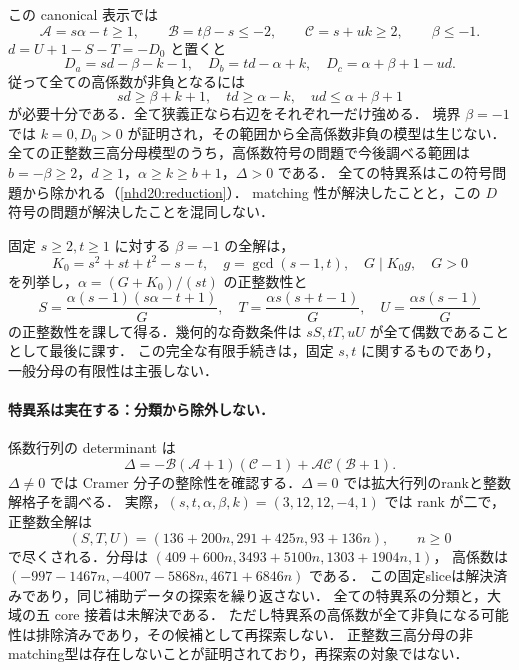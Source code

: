 この canonical 表示では
\[
 \mathcal A=s\alpha-t\geq1,\qquad
 \mathcal B=t\beta-s\leq-2,\qquad
 \mathcal C=s+uk\geq2,\qquad \beta\leq-1.
\]
$d=U+1-S-T=-D_0$ と置くと
\[
 D_a=sd-\beta-k-1,\quad D_b=td-\alpha+k,\quad
 D_c=\alpha+\beta+1-ud.
\]
従って全ての高係数が非負となるには
\[
 sd\geq\beta+k+1,\quad td\geq\alpha-k,\quad
 ud\leq\alpha+\beta+1
\]
が必要十分である．全て狭義正なら右辺をそれぞれ一だけ強める．
境界 $\beta=-1$ では $k=0,D_0>0$ が証明され，その範囲から全高係数非負の模型は生じない．
全ての正整数三高分母模型のうち，高係数符号の問題で今後調べる範囲は
$b=-\beta\ge2$，$d\ge1$，$\alpha\ge k\ge b+1$，$\Delta>0$ である．
全ての特異系はこの符号問題から除かれる（\ref{nhd20:reduction}）．
matching 性が解決したことと，この $D$ 符号の問題が解決したことを混同しない．

固定 $s\geq2,t\geq1$ に対する $\beta=-1$ の全解は，
\[
 K_0=s^2+st+t^2-s-t,\quad g=\gcd(s-1,t),\quad G\mid K_0g,\quad G>0
\]
を列挙し，$\alpha=(G+K_0)/(st)$ の正整数性と
\[
 S=\frac{\alpha(s-1)(s\alpha-t+1)}G,\quad
 T=\frac{\alpha s(s+t-1)}G,\quad
 U=\frac{\alpha s(s-1)}G
\]
の正整数性を課して得る．幾何的な奇数条件は $sS,tT,uU$ が全て偶数であることとして最後に課す．
この完全な有限手続きは，固定 $s,t$ に関するものであり，一般分母の有限性は主張しない．

\paragraph{特異系は実在する：分類から除外しない．}
係数行列の determinant は
\[
 \Delta=-\mathcal B(\mathcal A+1)(\mathcal C-1)
          +\mathcal A\mathcal C(\mathcal B+1).
\]
$\Delta\ne0$ では Cramer 分子の整除性を確認する．$\Delta=0$ では拡大行列のrankと整数解格子を調べる．
実際，$(s,t,\alpha,\beta,k)=(3,12,12,-4,1)$ では rank が二で，正整数全解は
\[
 (S,T,U)=(136+200n,291+425n,93+136n),\qquad n\geq0
\]
で尽くされる．分母は $(409+600n,3493+5100n,1303+1904n,1)$，
高係数は $(-997-1467n,-4007-5868n,4671+6846n)$ である．
この固定sliceは解決済みであり，同じ補助データの探索を繰り返さない．
全ての特異系の分類と，大域の五 core 接着は未解決である．
ただし特異系の高係数が全て非負になる可能性は排除済みであり，その候補として再探索しない．
正整数三高分母の非matching型は存在しないことが証明されており，再探索の対象ではない．



